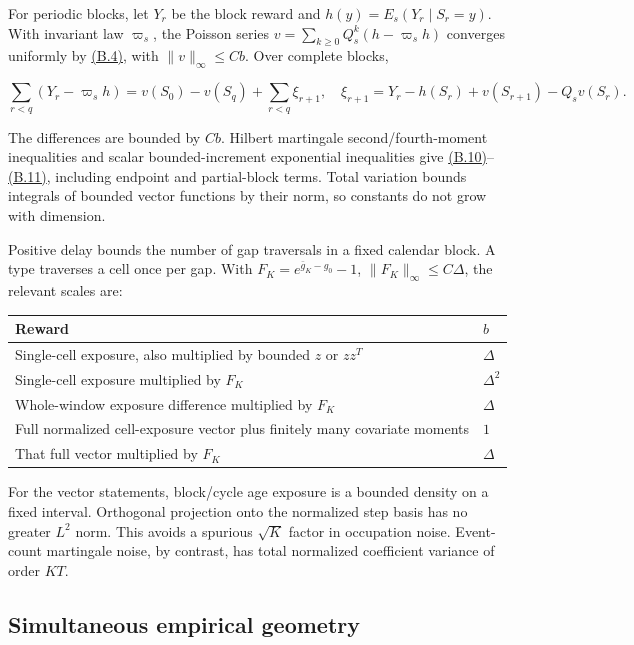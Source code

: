 \documentclass[11pt]{article}
\begin{document}
For periodic blocks, let \(Y_r\) be the block reward and \(h(y)=E_s(Y_r\mid S_r=y)\). With invariant law \(\varpi_s\), the Poisson series
\(v=\sum_{k\geq0}Q_s^k(h-\varpi_sh)\) converges uniformly by \hyperref[eq:B.4]{(B.4)}, with \(\|v\|_\infty\leq Cb\). Over complete blocks,

\begin{equation*}
\sum_{r<q}(Y_r-\varpi_sh)=v(S_0)-v(S_q)+\sum_{r<q}\xi_{r+1},
\quad
\xi_{r+1}=Y_r-h(S_r)+v(S_{r+1})-Q_sv(S_r).
\tag{B.12}\label{eq:B.12}
\end{equation*}

The differences are bounded by \(Cb\). Hilbert martingale second/fourth-moment inequalities and scalar bounded-increment exponential inequalities give \hyperref[eq:B.10]{(B.10)}--\hyperref[eq:B.11]{(B.11)}, including endpoint and partial-block terms. Total variation bounds integrals of bounded vector functions by their norm, so constants do not grow with dimension.

Positive delay bounds the number of gap traversals in a fixed calendar block. A type traverses a cell once per gap. With \(F_K=e^{\bar g_K-g_0}-1\), \(\|F_K\|_\infty\leq C\Delta\), the relevant scales are:

{\setlength{\tabcolsep}{4pt}
\begin{longtable}{ll}
\toprule
\textbf{Reward} & \textbf{\(b\)} \\
\midrule
\endhead
\bottomrule
\endlastfoot
Single-cell exposure, also multiplied by bounded \(z\) or \(zz^T\) & \(\Delta\) \\
Single-cell exposure multiplied by \(F_K\) & \(\Delta^2\) \\
Whole-window exposure difference multiplied by \(F_K\) & \(\Delta\) \\
Full normalized cell-exposure vector plus finitely many covariate moments & \(1\) \\
That full vector multiplied by \(F_K\) & \(\Delta\) \\
\end{longtable}}

For the vector statements, block/cycle age exposure is a bounded density on a fixed interval. Orthogonal projection onto the normalized step basis has no greater \(L^2\) norm. This avoids a spurious \(\sqrt K\) factor in occupation noise. Event-count martingale noise, by contrast, has total normalized coefficient variance of order \(KT\).

\subsection{Simultaneous empirical geometry}\label{sec:B.4}
\end{document}
